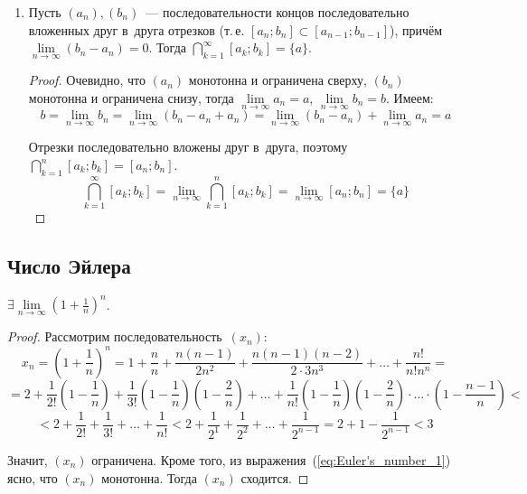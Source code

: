\begin{enumerate}
	\item {}
	\begin{lemma}
	\label{lemma:about_nested_intervals}
	Пусть $(a_n), (b_n)$~--- последовательности концов последовательно вложенных друг в~друга отрезков (т.\,е. $[a_n; b_n] \subset [a_{n-1}; b_{n-1}]$), причём $\lim\limits_{n \to \infty} (b_n - a_n) = 0$.
	Тогда $\bigcap\limits_{k=1}^\infty [a_k; b_k] = \{ a \}$.
	\end{lemma}
	\begin{proof}
	Очевидно, что $(a_n)$ монотонна и ограничена сверху, $(b_n)$ монотонна и ограничена снизу, тогда $\lim\limits_{n \to \infty} a_n = a$, $\lim\limits_{n \to \infty} b_n = b$.
	Имеем:
	\begin{equation*}
	b = \lim_{n \to \infty} b_n = \lim_{n \to \infty} (b_n - a_n + a_n) = \lim_{n \to \infty} (b_n - a_n) + \lim_{n \to \infty} a_n = a
	\end{equation*}
	
	Отрезки последовательно вложены друг в~друга, поэтому $\bigcap\limits_{k=1}^n [a_k; b_k] = [a_n; b_n]$.
	\begin{equation*}
	\bigcap_{k=1}^\infty [a_k; b_k] = \lim_{n \to \infty} \bigcap_{k=1}^n [a_k; b_k] = \lim_{n \to \infty} [a_n; b_n] = \{ a \}
	\end{equation*}
	\end{proof}
\end{enumerate}

\subsection{Число Эйлера}
\begin{statement}
$\exists \lim\limits_{n \to \infty} \left( 1 + \frac1n \right)^n$.
\end{statement}
\begin{proof}
Рассмотрим последовательность~$(x_n) \colon$
\begin{equation*}
x_n = \left( 1 + \frac1n \right)^n = 1 + \frac{n}n + \frac{n(n - 1)}{2n^2} + \frac{n(n - 1)(n - 2)}{2 \cdot 3n^3} + \ldots + \frac{n!}{n!n^n} =
\end{equation*}
\begin{equation}
\label{eq:Euler's_number_1}
= 2 + \frac1{2!} \left( 1 - \frac1n \right) + \frac1{3!} \left( 1 - \frac1n \right) \left( 1 - \frac2n \right) + \ldots + \frac1{n!} \left( 1 - \frac1n \right) \left( 1 - \frac2n \right) \cdot \ldots \cdot \left( 1 - \frac{n - 1}n \right) <
\end{equation}
\begin{equation*}
< 2 + \frac1{2!} + \frac1{3!} + \ldots + \frac1{n!} < 2 + \frac1{2^1} + \frac1{2^2} + \ldots + \frac1{2^{n-1}} = 2 + 1 - \frac1{2^{n-1}} < 3
\end{equation*}

Значит, $(x_n)$ ограничена.
Кроме того, из выражения~(\ref*{eq:Euler's_number_1}) ясно, что $(x_n)$ монотонна.
Тогда $(x_n)$ сходится.
\end{proof}

